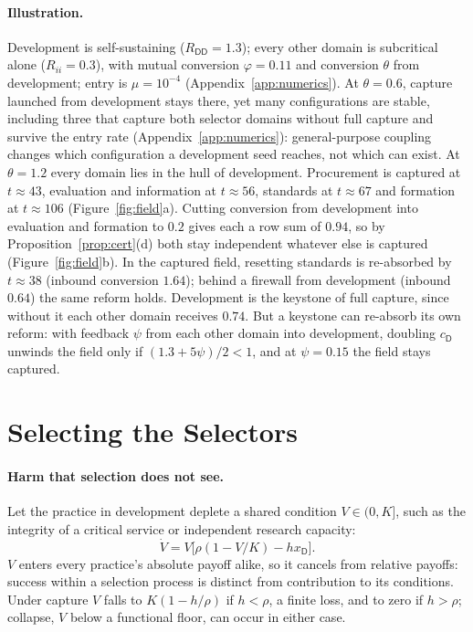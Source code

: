\documentclass[letterpaper]{article} %
\theoremstyle{definition}
\newcommand{\dD}{\mathsf{D}}
\begin{document}
\paragraph{Illustration.} Development is self-sustaining ($R_{\dD\dD}=1.3$); every other domain is subcritical alone ($R_{ii}=0.3$), with mutual conversion $\varphi=0.11$ and conversion $\theta$ from development; entry is $\mu=10^{-4}$ (Appendix~\ref{app:numerics}). At $\theta=0.6$, capture launched from development stays there, yet many configurations are stable, including three that capture both selector domains without full capture and survive the entry rate (Appendix~\ref{app:numerics}): general-purpose coupling changes which configuration a development seed reaches, not which can exist. At $\theta=1.2$ every domain lies in the hull of development. Procurement is captured at $t\approx43$, evaluation and information at $t\approx56$, standards at $t\approx67$ and formation at $t\approx106$ (Figure~\ref{fig:field}a). Cutting conversion from development into evaluation and formation to $0.2$ gives each a row sum of $0.94$, so by Proposition~\ref{prop:cert}(d) both stay independent whatever else is captured (Figure~\ref{fig:field}b). In the captured field, resetting standards is re-absorbed by $t\approx38$ (inbound conversion $1.64$); behind a firewall from development (inbound $0.64$) the same reform holds. Development is the keystone of full capture, since without it each other domain receives $0.74$. But a keystone can re-absorb its own reform: with feedback $\psi$ from each other domain into development, doubling $c_\dD$ unwinds the field only if $(1.3+5\psi)/2<1$, and at $\psi=0.15$ the field stays captured.

\section{Selecting the Selectors}\label{sec:selectors}

\paragraph{Harm that selection does not see.} Let the practice in development deplete a shared condition $V\in(0,K]$, such as the integrity of a critical service or independent research capacity:
\begin{equation}\label{eq:V}
\dot V=V\big[\rho(1-V/K)-hx_\dD\big].
\end{equation}
$V$ enters every practice's absolute payoff alike, so it cancels from relative payoffs: success within a selection process is distinct from contribution to its conditions. Under capture $V$ falls to $K(1-h/\rho)$ if $h<\rho$, a finite loss, and to zero if $h>\rho$; collapse, $V$ below a functional floor, can occur in either case.
\end{document}
